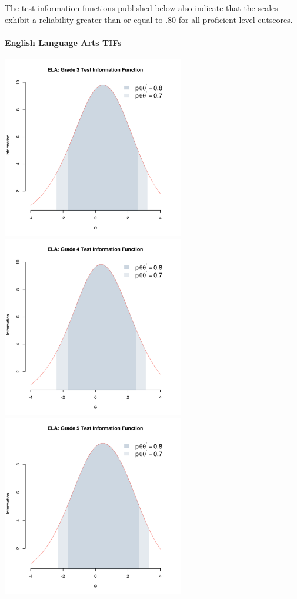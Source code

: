 \documentclass[]{article}
\let\oldparagraph\paragraph
\renewcommand{\paragraph}[1]{\oldparagraph{#1}\mbox{}}
\begin{document}
The test information functions published below also indicate that the
scales exhibit a reliability greater than or equal to .80 for all
proficient-level cutscores.

\paragraph{English Language Arts TIFs}\label{english-language-arts-tifs}

\FloatBarrier
\includegraphics[height=3.12500in]{tifs/ela3tif.pdf}
\includegraphics[height=3.12500in]{tifs/ela4tif.pdf}
\includegraphics[height=3.12500in]{tifs/ela5tif.pdf}
\end{document}
